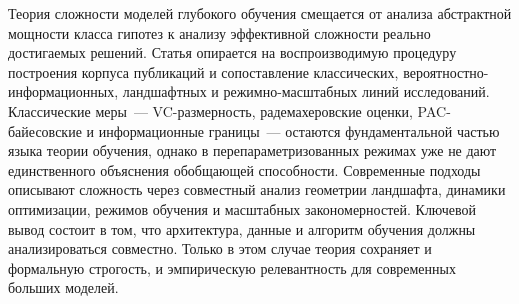 Теория сложности моделей глубокого обучения смещается от анализа абстрактной мощности класса гипотез к анализу эффективной сложности реально достигаемых решений.
Статья опирается на воспроизводимую процедуру построения корпуса публикаций и сопоставление классических, вероятностно-информационных, ландшафтных и режимно-масштабных линий исследований.
Классические меры~--- VC-размерность, радемахеровские оценки, PAC-байесовские и информационные границы~--- остаются фундаментальной частью языка теории обучения, однако в перепараметризованных режимах уже не дают единственного объяснения обобщающей способности.
Современные подходы описывают сложность через совместный анализ геометрии ландшафта, динамики оптимизации, режимов обучения и масштабных закономерностей.
Ключевой вывод состоит в том, что архитектура, данные и алгоритм обучения должны анализироваться совместно. Только в этом случае теория сохраняет и формальную строгость, и эмпирическую релевантность для современных больших моделей.

